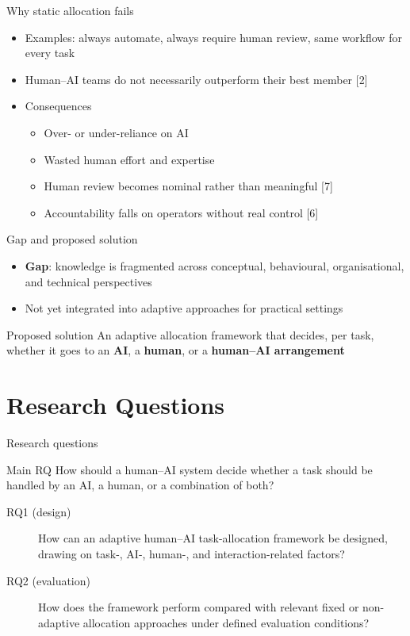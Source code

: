\documentclass[aspectratio=169,11pt]{beamer}
\begin{document}
\begin{frame}{Why static allocation fails}
  \begin{itemize}
    \item Examples: always automate, always require human review, same workflow for every task
    \item Human--AI teams do not necessarily outperform their best member [2]
    \item Consequences
    \begin{itemize}
      \item Over- or under-reliance on AI
      \item Wasted human effort and expertise
      \item Human review becomes nominal rather than meaningful [7]
      \item Accountability falls on operators without real control [6]
    \end{itemize}
  \end{itemize}
\end{frame}

\begin{frame}{Gap and proposed solution}
  \begin{itemize}
    \item \textbf{Gap}: knowledge is fragmented across conceptual, behavioural,
      organisational, and technical perspectives
    \item Not yet integrated into adaptive approaches for practical settings
  \end{itemize}
  \vspace{1em}
  \begin{alertblock}{Proposed solution}
    An adaptive allocation framework that decides, per task, whether it goes to
    an \textbf{AI}, a \textbf{human}, or a \textbf{human--AI arrangement}
  \end{alertblock}
\end{frame}

\section{Research Questions}

\begin{frame}{Research questions}
  \begin{block}{Main RQ}
    How should a human--AI system decide whether a task should be handled by an AI,
    a human, or a combination of both?
  \end{block}
  \begin{description}
    \item[RQ1 (design)] How can an adaptive human--AI task-allocation framework be
      designed, drawing on task-, AI-, human-, and interaction-related factors?
    \item[RQ2 (evaluation)] How does the framework perform compared with relevant
      fixed or non-adaptive allocation approaches under defined evaluation conditions?
  \end{description}
\end{frame}
\end{document}
